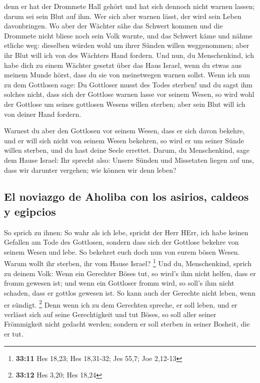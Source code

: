  denn er hat der Drommete Hall gehört und hat sich dennoch
nicht warnen lassen; darum sei sein Blut auf ihm. Wer sich aber warnen
lässt, der wird sein Leben davonbringen.  Wo aber der
Wächter sähe das Schwert kommen und die Drommete nicht bliese noch sein
Volk warnte, und das Schwert käme und nähme etliche weg: dieselben
würden wohl um ihrer Sünden willen weggenommen; aber ihr Blut will ich
von des Wächters Hand fordern.  Und nun, du Menschenkind,
ich habe dich zu einem Wächter gesetzt über das Haus Israel, wenn du
etwas aus meinem Munde hörst, dass du sie von meinetwegen warnen sollst.
 Wenn ich nun zu dem Gottlosen sage: Du Gottloser musst
des Todes sterben! und du sagst ihm solches nicht, dass sich der
Gottlose warnen lasse vor seinem Wesen, so wird wohl der Gottlose um
seines gottlosen Wesens willen sterben; aber sein Blut will ich von
deiner Hand fordern.

 Warnest du aber den Gottlosen vor seinem Wesen, dass er
sich davon bekehre, und er will sich nicht von seinem Wesen bekehren, so
wird er um seiner Sünde willen sterben, und du hast deine Seele
errettet.  Darum, du Menschenkind, sage dem Hause Israel:
Ihr sprecht also: Unsere Sünden und Missetaten liegen auf uns, dass wir
darunter vergehen; wie können wir denn leben?

\hypertarget{el-noviazgo-de-aholiba-con-los-asirios-caldeos-y-egipcios}{%
\subsection{El noviazgo de Aholiba con los asirios, caldeos y
egipcios}\label{el-noviazgo-de-aholiba-con-los-asirios-caldeos-y-egipcios}}

 So sprich zu ihnen: So wahr als ich lebe, spricht der
Herr HErr, ich habe keinen Gefallen am Tode des Gottlosen, sondern dass
sich der Gottlose bekehre von seinem Wesen und lebe. So bekehret euch
doch nun von eurem bösen Wesen. Warum wollt ihr sterben, ihr vom Hause
Israel? \footnote{\textbf{33:11} Hes 18,23; Hes 18,31-32; Jes 55,7; Joe
  2,12-13}  Und du, Menschenkind, sprich zu deinem Volk:
Wenn ein Gerechter Böses tut, so wird's ihm nicht helfen, dass er fromm
gewesen ist; und wenn ein Gottloser fromm wird, so soll's ihm nicht
schaden, dass er gottlos gewesen ist. So kann auch der Gerechte nicht
leben, wenn er sündigt. \footnote{\textbf{33:12} Hes 3,20; Hes 18,24}
 Denn wenn ich zu dem Gerechten spreche, er soll leben,
und er verlässt sich auf seine Gerechtigkeit und tut Böses, so soll
aller seiner Frömmigkeit nicht gedacht werden; sondern er soll sterben
in seiner Bosheit, die er tut.

